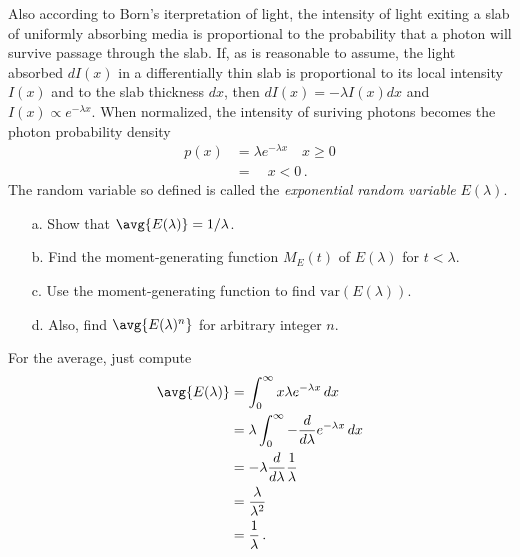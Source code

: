 

Also according to Born's iterpretation of light, the intensity of light exiting a slab of uniformly absorbing media is proportional to the probability that a photon will survive passage through the slab.
If, as is reasonable to assume, the light absorbed $dI(x)$ in a differentially thin slab is proportional to its local intensity $I(x)$ and to the slab thickness $dx$, then $dI(x) = -\lambda I(x)dx$ and $I(x) \propto e^{-\lambda x}$.
When normalized, the intensity of suriving photons becomes the photon probability density
\begin{align*}
  p(x) &= \lambda e^{-\lambda x} \quad x \geq 0 \\
       &= \quad x < 0 \, .
\end{align*}
The random variable so defined is called the \textit{exponential random variable} $E(\lambda)$.
\begin{itemize}
  \item[a.] Show that $\avg{E(\lambda)} = 1 / \lambda$.
  \item[b.] Find the moment-generating function $M_E(t)$ of $E(\lambda)$ for $t<\lambda$.
  \item[c.] Use the moment-generating function to find $\text{var}(E(\lambda))$.
  \item[d.] Also, find $\avg{E(\lambda)^n}$ for arbitrary integer $n$.
\end{itemize}


For the average, just compute
\begin{align*}
  \avg{E(\lambda)}
  &= \int_0^\infty x \lambda e^{-\lambda x} \, dx \\
  &= \lambda \int_0^\infty - \frac{d}{d\lambda}  e^{-\lambda x} \, dx \\
  &= - \lambda \frac{d}{d\lambda} \frac{1}{\lambda} \\
  &= \frac{\lambda}{\lambda^2} \\
  &= \frac{1}{\lambda} \, .
\end{align*}

